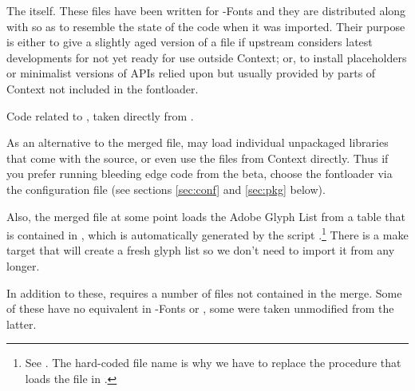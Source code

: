 \begindefinitions
  \beginnormalitem
    The  itself.
    These files have been written for \LUATEX-Fonts and they are
    distributed along with  so as to resemble
    the state of the code when it was imported. Their purpose is either
    to give a slightly aged version of a file if upstream considers
    latest developments for not yet ready for use outside Context; or,
    to install placeholders or minimalist versions of APIs relied upon
    but usually provided by parts of Context not included in the
    fontloader.
    \begindoublecolumns
      \begindefinitions
      \enddefinitions
    \enddoublecolumns
  \endnormalitem

  \beginnormalitem
    Code related to , taken
    directly from \CONTEXT.
    \begindoublecolumns
      \begindefinitions
      \enddefinitions
    \enddoublecolumns
  \endnormalitem
\enddefinitions

As an alternative to the merged file,  may load
individual unpackaged \LUA libraries that come with the source, or even
use the files from Context directly.
%
Thus if you prefer running bleeding edge code from the \CONTEXT beta,
choose the  fontloader via the configuration file
(see sections \ref{sec:conf} and \ref{sec:pkg} below).

Also, the merged file at some point loads the Adobe Glyph List from a
\LUA table that is contained in ,
which is automatically generated by the script
.\footnote{%
  See .
  The hard-coded file name is why we have to replace the procedure
  that loads the file in .
}
%
There is a make target  that will create a fresh
glyph list so we don’t need to import it from \CONTEXT any longer.

In addition to these,  requires a number of
files not contained in the merge. Some of these have no equivalent in
\LUATEX-Fonts or \CONTEXT, some were taken unmodified from the latter.


